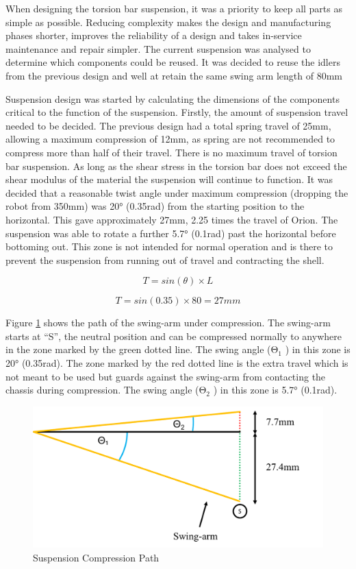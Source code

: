 When designing the torsion bar suspension, it was a priority to keep all parts as simple as possible. Reducing complexity makes the design and manufacturing phases shorter, improves the reliability of a design and takes in-service maintenance and repair simpler. The current suspension was analysed to determine which components could be reused. It was decided to reuse the idlers from the previous design and well at retain the same swing arm length of 80mm \par

Suspension design was started by calculating the dimensions of the components critical to the function of the suspension. Firstly, the amount of suspension travel needed to be decided. The previous design had a total spring travel of 25mm, allowing a maximum compression of 12mm, as spring are not recommended to compress more than half of their travel. There is no maximum travel of torsion bar suspension. As long as the shear stress in the torsion bar does not exceed the shear modulus of the material the suspension will continue to function. It was decided that a reasonable twist angle under maximum compression (dropping the robot from 350mm) was 20° (0.35rad) from the starting position to the horizontal. This gave approximately 27mm, 2.25 times the travel of Orion. The suspension was able to rotate a further 5.7° (0.1rad) past the horizontal before bottoming out. This zone is not intended for normal operation and is there to prevent the suspension from running out of travel and contracting the shell.\par

\begin{equation}
T= sin(\theta) \times L
\end{equation}

\[T = sin(0.35) \times 80 = 27mm\]


Figure \ref{fig:SwingDiag} shows the path of the swing-arm under compression. The swing-arm starts at “S”, the neutral position and can be compressed normally to anywhere in the zone marked by the green dotted line. The swing angle (Θ$_1$ ) in this zone is 20° (0.35rad). The zone marked by the red dotted line is the extra travel which is not meant to be used but guards against the swing-arm from contacting the chassis during compression. The swing angle (Θ$_2$ ) in this zone is 5.7° (0.1rad).

\begin{figure}[h]
\centering\includegraphics[width=0.6\linewidth]{Images/MaxImages/Swing_Diag.png}
\caption{Suspension Compression Path}
\label{fig:SwingDiag}
\end{figure}

